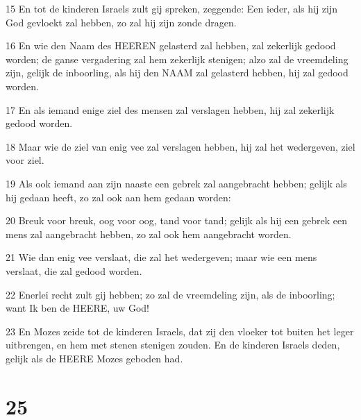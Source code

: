 \par 15 En tot de kinderen Israels zult gij spreken, zeggende: Een ieder, als hij zijn God gevloekt zal hebben, zo zal hij zijn zonde dragen.
\par 16 En wie den Naam des HEEREN gelasterd zal hebben, zal zekerlijk gedood worden; de ganse vergadering zal hem zekerlijk stenigen; alzo zal de vreemdeling zijn, gelijk de inboorling, als hij den NAAM zal gelasterd hebben, hij zal gedood worden.
\par 17 En als iemand enige ziel des mensen zal verslagen hebben, hij zal zekerlijk gedood worden.
\par 18 Maar wie de ziel van enig vee zal verslagen hebben, hij zal het wedergeven, ziel voor ziel.
\par 19 Als ook iemand aan zijn naaste een gebrek zal aangebracht hebben; gelijk als hij gedaan heeft, zo zal ook aan hem gedaan worden:
\par 20 Breuk voor breuk, oog voor oog, tand voor tand; gelijk als hij een gebrek een mens zal aangebracht hebben, zo zal ook hem aangebracht worden.
\par 21 Wie dan enig vee verslaat, die zal het wedergeven; maar wie een mens verslaat, die zal gedood worden.
\par 22 Enerlei recht zult gij hebben; zo zal de vreemdeling zijn, als de inboorling; want Ik ben de HEERE, uw God!
\par 23 En Mozes zeide tot de kinderen Israels, dat zij den vloeker tot buiten het leger uitbrengen, en hem met stenen stenigen zouden. En de kinderen Israels deden, gelijk als de HEERE Mozes geboden had.

\chapter{25}

